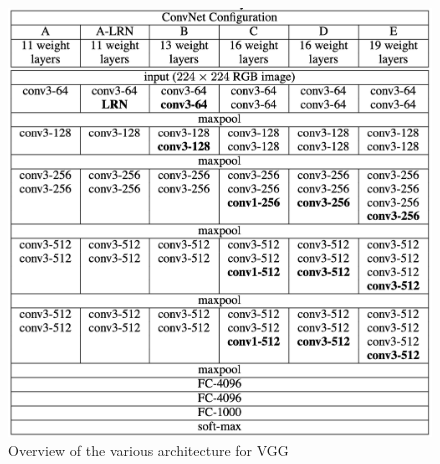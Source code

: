 \begin{figure}[htb]
    \centering
    \includegraphics[scale = 0.5]{img/vgg_arch.png}
    \caption[Overview of the various architecture for VGG]{Overview of the various architecture for VGG \cite{simonyan2015deep}}
    \label{fig:vgg_arch}
\end{figure}








